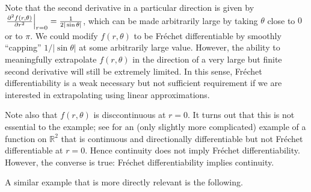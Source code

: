 \begin{ex}
Note that the second derivative in a particular direction is given by
$\left.\frac{\partial^2 f(r, \theta)}{\partial r^2}\right\vert_{r=0} = \frac{1}{2 |\sin
\theta|}$, which can be made arbitrarily large by taking $\theta$ close to $0$
or to $\pi$.  We could modify $f(r, \theta)$ to be Fr{\'e}chet differentiable
by smoothly ``capping'' $1 / |\sin \theta|$ at some arbitrarily large value.
However, the ability to meaningfully extrapolate $f(r, \theta)$ in the direction
of a very large but finite second derivative will still be extremely limited. In
this sense, Fr{\'e}chet differentiability is a weak necessary but not sufficient
requirement if we are interested in extrapolating using linear approximations.

Note also that $f(r, \theta)$ is disccontinuous at $r=0$.  It turns out that
this is not essential to the example; see \citet[Example
1.9]{averbukh:1967:theory} for an (only slightly more complicated) example of a
function on $\mathbb{R}^2$ that is continuous and directionally differentiable
but not Fr{\'e}chet differentiable at $r=0$.  Hence continuity does not imply
Fr{\'e}chet differentiability.  However, the converse is true: Fr{\'e}chet
differentiability implies continuity.

\end{ex}



A similar example that is more directly relevant is the following.

